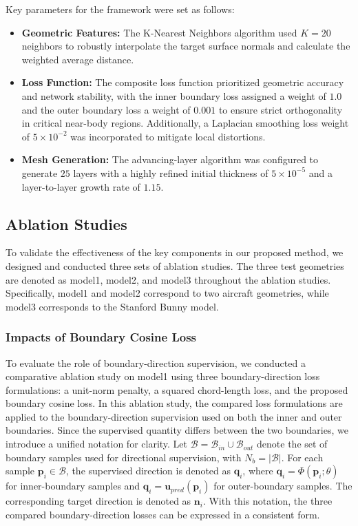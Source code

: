 \documentclass[%
 aip,
 amsmath,amssymb,
 reprint,%
nobibnotes,
]{revtex4-1}
\newcounter{algorithm}
\begin{document}
Key parameters for the framework were set as follows:

\begin{itemize}
    \item \textbf{Geometric Features:} The K-Nearest Neighbors algorithm used $K = 20$ neighbors to robustly interpolate the target surface normals and calculate the weighted average distance.
    
    \item \textbf{Loss Function:} The composite loss function prioritized geometric accuracy and network stability, with the inner boundary loss assigned a weight of $1.0$ and the outer boundary loss a weight of $0.001$ to ensure strict orthogonality in critical near-body regions. Additionally, a Laplacian smoothing loss weight of $5 \times 10^{-2}$ was incorporated to mitigate local distortions.
    
    \item \textbf{Mesh Generation:} The advancing-layer algorithm was configured to generate $25$ layers with a highly refined initial thickness of $5 \times 10^{-5}$ and a layer-to-layer growth rate of $1.15$.
\end{itemize}

\subsection{\label{sec:level3}Ablation Studies}
To validate the effectiveness of the key components in our proposed method, we designed and conducted three sets of ablation studies.
The three test geometries are denoted as model1, model2, and model3 throughout the ablation studies. Specifically, model1 and model2 correspond to two aircraft geometries, while model3 corresponds to the Stanford Bunny model.

\subsubsection{\label{sec:level3-1}Impacts of Boundary Cosine Loss}

To evaluate the role of boundary-direction supervision, we conducted a comparative ablation study on model1 using three boundary-direction loss formulations: a unit-norm penalty, a squared chord-length loss, and the proposed boundary cosine loss. 
In this ablation study, the compared loss formulations are applied to the boundary-direction supervision used on both the inner and outer boundaries. Since the supervised quantity differs between the two boundaries, we introduce a unified notation for clarity. Let \(\mathcal{B}=\mathcal{B}_{in}\cup\mathcal{B}_{out}\) denote the set of boundary samples used for directional supervision, with \(N_b=|\mathcal{B}|\). For each sample \(\mathbf{p}_i\in\mathcal{B}\), the supervised direction is denoted as \(\mathbf{q}_i\), where \(\mathbf{q}_i=\Phi(\mathbf{p}_i;\theta)\) for inner-boundary samples and \(\mathbf{q}_i=\mathbf{u}_{pred}(\mathbf{p}_i)\) for outer-boundary samples. The corresponding target direction is denoted as \(\mathbf{n}_i\).
With this notation, the three compared boundary-direction losses can be expressed in a consistent form.
\end{document}
